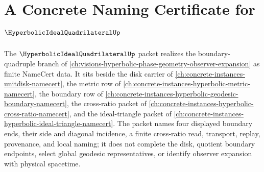 \chapter{A Concrete Naming Certificate for $\HyperbolicIdealQuadrilateralUp$}
\label{ch:concrete-instances-hyperbolic-ideal-quadrilateral-namecert}

The $\HyperbolicIdealQuadrilateralUp$ packet realizes the boundary-quadruple branch of \autoref{ch:visions-hyperbolic-phase-geometry-observer-expansion} as finite NameCert data. It sits beside the disk carrier of \autoref{ch:concrete-instances-unitdisk-namecert}, the metric row of \autoref{ch:concrete-instances-hyperbolic-metric-namecert}, the boundary row of \autoref{ch:concrete-instances-hyperbolic-geodesic-boundary-namecert}, the cross-ratio packet of \autoref{ch:concrete-instances-hyperbolic-cross-ratio-namecert}, and the ideal-triangle packet of \autoref{ch:concrete-instances-hyperbolic-ideal-triangle-namecert}. The packet names four displayed boundary ends, their side and diagonal incidence, a finite cross-ratio read, transport, replay, provenance, and local naming; it does not complete the disk, quotient boundary endpoints, select global geodesic representatives, or identify observer expansion with physical spacetime.

